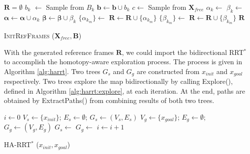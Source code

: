 \documentclass[letterpaper, 10 pt, conference]{ieeeconf}
\begin{document}
\begin{algorithm}[hbtp]
	\begin{algorithmic}[1]
		\State $ \bm{R} = \emptyset $
			\State $ b_{k} $ $ \leftarrow $ Sample from $ B_{k} $
			\State $ \bm{b} \leftarrow \bm{b} \cup b_{k} $
		\EndFor
			\State $ c \leftarrow  $ Sample from $ \bm{X}_{free} $
		\EndWhile
			\State $ \alpha_{k} \leftarrow $ 
			\State $ \beta_{k} \leftarrow $ 
			\State $ \bm{\alpha} \leftarrow \bm{\alpha} \cup \alpha_{k} $
			\State $ \bm{\beta} \leftarrow \bm{\beta} \cup \beta_{k} $			
		\EndFor
			\State $ \{ \alpha_{k_{m}} \} \leftarrow $ 
			\State $ \bm{R} \leftarrow \bm{R} \cup \{ \alpha_{k_{m}} \} $
		\EndFor
			\State $ \{ \beta_{k_{m}} \} \leftarrow $ 
			\State $ \bm{R} \leftarrow \bm{R} \cup \{ \beta_{k_{m}} \} $
		\EndFor
		\Return $ \bm{R} $
	\end{algorithmic}
	\caption{ \textsc{InitRefFrames} ($ \bm{X}_{free} , \bm{B} $) }
	\label{alg:harrt:init_ref_frames}
\end{algorithm} 

With the generated reference frames $ \mathbf{R} $, we could import the bidirectional RRT$^{*}$ to accomplish the homotopy-aware exploration process.
The process is given in Algorithm \ref{alg:harrt}.
Two trees $ G_{s} $ and $ G_{g} $ are constructed from $ x_{init} $ and $ x_{goal} $ respectively.
Two trees explore the map bidirectionally by calling {\sc Explore}(), defined in Algorithm \ref{alg:harrt:explore}, at each iteration.
At the end, paths are obtained by {\sc ExtractPaths}() from combining results of both two trees.

\begin{algorithm}[hbtp]
	\begin{algorithmic}[1]
		\State $ i \leftarrow 0 $
		\State $ V_{s} \leftarrow \{ x_{init} \} $; $ E_{s} \leftarrow \emptyset $; $ G_{s} \leftarrow (V_{s}, E_{s}) $
		\State $ V_{g} \leftarrow \{ x_{goal} \} $; $ E_{g} \leftarrow \emptyset $; $ G_{g} \leftarrow (V_{g}, E_{g}) $
			\State $ G_{s} \leftarrow $ 
			\State $ G_{g} \leftarrow $ 
			\State $ i \leftarrow i + 1 $
		\EndWhile
		\State {}
	\end{algorithmic}
	\caption{HA-RRT$^{*}$ ($ x_{init} , x_{goal}  $) }
	\label{alg:harrt}
\end{algorithm}
\end{document}
